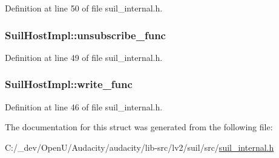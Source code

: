 Definition at line 50 of file suil\+\_\+internal.\+h.

\subsubsection[{\texorpdfstring{unsubscribe\+\_\+func}{unsubscribe_func}}]{ Suil\+Host\+Impl\+::unsubscribe\+\_\+func}\hypertarget{struct_suil_host_impl_af6a3e9fc9c19f365302f988e7b550291}{}\label{struct_suil_host_impl_af6a3e9fc9c19f365302f988e7b550291}


Definition at line 49 of file suil\+\_\+internal.\+h.

\subsubsection[{\texorpdfstring{write\+\_\+func}{write_func}}]{ Suil\+Host\+Impl\+::write\+\_\+func}\hypertarget{struct_suil_host_impl_aec41a31fe5d52c8b122aa01d3f0a5e0a}{}\label{struct_suil_host_impl_aec41a31fe5d52c8b122aa01d3f0a5e0a}


Definition at line 46 of file suil\+\_\+internal.\+h.



The documentation for this struct was generated from the following file\+:\begin{DoxyCompactItemize}
\item 
C\+:/\+\_\+dev/\+Open\+U/\+Audacity/audacity/lib-\/src/lv2/suil/src/\hyperlink{suil__internal_8h}{suil\+\_\+internal.\+h}\end{DoxyCompactItemize}
